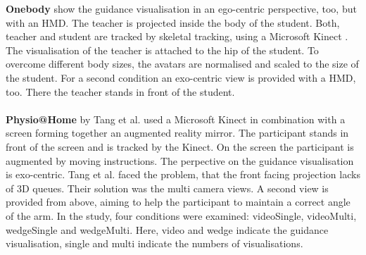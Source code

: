 \textbf{Onebody} \cite{Hoang2016} show the guidance visualisation in an ego-centric perspective, too, but with an HMD. The teacher is projected inside the body of the student. Both, teacher and student are tracked by skeletal tracking, using a Microsoft Kinect \todo. The visualisation of the teacher is attached to the hip of the student. To overcome different body sizes, the avatars are normalised and scaled to the size of the student. For a second condition an exo-centric view is provided with a HMD, too. There the teacher stands in front of the student.\\ \\
\textbf{Physio@Home} by Tang et al. \cite{Tang2015} used a Microsoft Kinect in combination with a screen forming together an augmented reality mirror. The participant stands in front of the screen and is tracked by the Kinect. On the screen the participant is augmented by moving instructions. The perpective on the guidance visualisation is exo-centric. Tang et al. faced the problem, that the front facing projection lacks of 3D queues. Their solution was the multi camera views. A second view is provided from above, aiming to help the participant to maintain a correct angle of the arm. In the study, four conditions were examined: videoSingle, videoMulti, wedgeSingle and wedgeMulti. Here, video and wedge indicate the guidance visualisation, single and multi indicate the numbers of visualisations.
